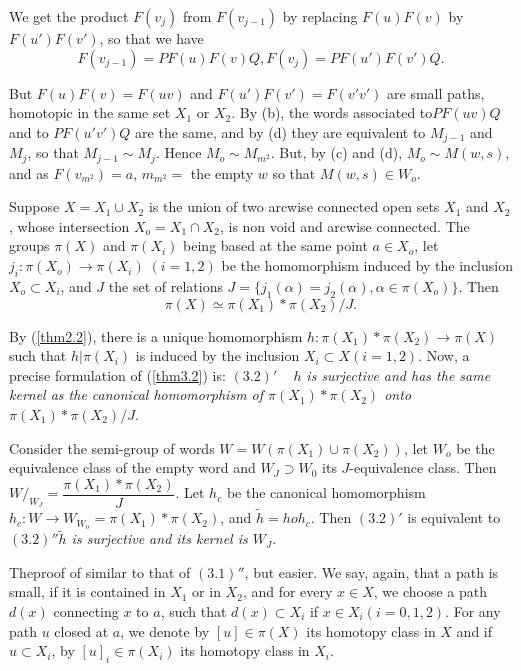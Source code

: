 We get the product $F(v_j)$ from $F(v_{j-1})$ by replacing $F(u)
F(v)$ by $F(u') F(v')$, so that we have 
$$
F(v_{j-1}) = PF (u) F(v) Q, F(v_j) = PF(u') F(v') Q. 
$$

But $F(u) F(v) =F(uv)$ and $F(u') F(v') =F(v' v')$ are small paths,
homotopic in the same set $X_1$ or $X_2$. By (b), the words
associated to\pageoriginale $PF(uv)Q$ and to $PF(u' v')Q$ are the
same, and by (d) they are equivalent to $M_{j-1}$ and $M_j$, so that
$M_{j-1} \sim M_j$. Hence $M_o \sim M_{m^2}$. But, by (c) and (d),
$M_o \sim M (w,s)$, and as $F(v_{m^2}) =a$, $m_{m^2}=$ the empty $w$
so that $M(w,s) \in  W_o$.  

\begin{theorem}\label{thm3.2} %
Suppose $X = X_1 \cup X_2$ is the union of two arcwise connected
  open sets $X_1$ and $X_2$, whose intersection $X_o = X_1 \cap X_2$,
  is non void and arcwise connected. The groups $\pi (X)$ and $\pi
  (X_i)$ being based at the same point $a \in X_o$, let $j_i: \pi
  (X_o) \to \pi (X_i) \; (i=1,2)$ be the homomorphism induced by the
  inclusion $X_o  \subset X_i$, and  $J$ the set of relations $J = \{
  j_1(\alpha) = j_2 (\alpha), \alpha \in  \pi (X_o) \}$. Then 
$$
\pi (X) \simeq \pi (X_1) \ast \pi (X_2) /J.  
$$
  \end{theorem}  
  
By (\ref{thm2.2}), there is a unique homomorphism $h: \pi (X_1) \ast  \pi
(X_2) \to \pi(X)$ such that $h | \pi (X_i)$ is induced by the
inclusion $X_i \subset X(i =1,2)$. Now, a precise formulation of
(\ref{thm3.2}) is: $(3.2)'$ ~ $h$ \textit{is surjective and has the same kernel
  as the canonical homomorphism of $\pi (X_1) \ast \pi(X_2) $ onto
  $\pi (X_1) \ast \pi (X_2) / J$}. 
  
Consider the semi-group of words $W=W ( \pi (X_1) \cup \pi
(X_2))$, let $W_o$ be the equivalence class of the empty word and $W_J
\supset W_0$ its $J$-equivalence class. Then $W/_{W_J} = \dfrac{\pi
  (X_1) \ast \pi (X_2)}{J}$. Let  $h_c$ be the canonical homomorphism
$h_c : W \to  W_{W_o}= \pi (X_1) \ast \pi (X_2)$, and $\tilde{h} = h
o h_c$. Then $(3.2)'$ is equivalent to \textit{$(3.2)'' \tilde{h}$ is
  surjective and its kernel is $W_J$}. 
  
The\pageoriginale proof of similar to that of $(3.1)''$, but
easier. We say, again, 
that a path is small, if it is contained in $X_1$ or in $X_2$, and for
every $x \in X$, we choose a path $d(x)$ connecting $x$ to $a$, such
that $d(x) \subset X_i$ if $x \in X_i (i= 0,1,2)$. For any path $u$
closed at $a$, we denote by $[u] \in  \pi (X)$ its homotopy class in
$X$ and if $u \subset X_i$, by  $[u]_i \in \pi (X_i)$ its homotopy
class in $X_i$. 
  
